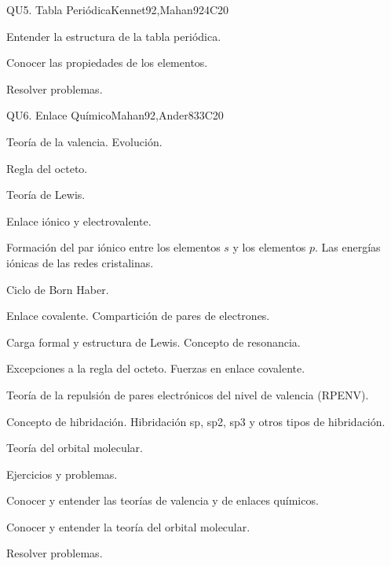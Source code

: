 \begin{syllabus}
\begin{unit}{QU5. Tabla Periódica}{}{Kennet92,Mahan92}{4}{C20}
   \begin{learningoutcomes}
      \item Entender la estructura de la tabla periódica.
      \item Conocer las propiedades de los elementos.
      \item Resolver problemas.
   \end{learningoutcomes}
\end{unit}

\begin{unit}{QU6. Enlace Químico}{}{Mahan92,Ander83}{3}{C20}
   \begin{topics}
	\item Teoría de  la valencia. Evolución.
	\item Regla del octeto.
	\item Teoría de Lewis.
	\item Enlace iónico y electrovalente.
	\item Formación del par iónico entre los elementos $s$ y los elementos $p$. Las energías iónicas de las redes cristalinas.
	\item Ciclo de Born Haber.
	\item Enlace covalente. Compartición de pares de electrones.
	\item Carga formal y estructura de Lewis. Concepto de resonancia.
	\item Excepciones a la regla del octeto. Fuerzas en enlace covalente.
	\item Teoría de la repulsión de pares electrónicos del nivel de valencia (RPENV).
	\item Concepto de hibridación. Hibridación sp, sp2, sp3 y otros tipos de hibridación.
	\item Teoría del orbital molecular.
	\item Ejercicios y problemas.
   \end{topics}

   \begin{learningoutcomes}
      \item Conocer y entender las teorías de valencia y de enlaces químicos.
      \item Conocer y entender la teoría del orbital molecular.
      \item Resolver problemas.
   \end{learningoutcomes}
\end{unit}


\end{syllabus}
